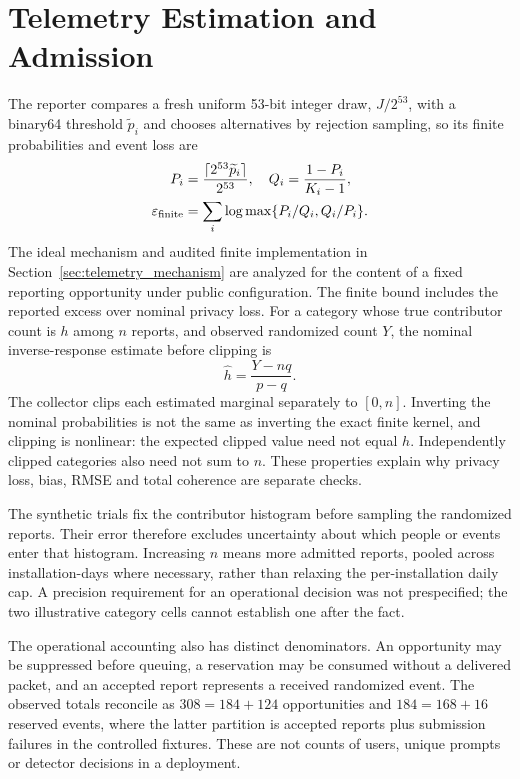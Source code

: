 \documentclass[sigconf]{acmart}
\theoremstyle{acmdefinition}\newtheorem{property}{Property}
\begin{document}
\section{Telemetry Estimation and Admission}
\label{app:reporting}
The reporter compares a fresh uniform 53-bit integer draw, $J/2^{53}$, with a binary64 threshold $\widetilde p_i$ and chooses alternatives by rejection sampling, so its finite probabilities and event loss are
\begin{equation}
\label{eq:finite}
\begin{aligned}
P_i&=\frac{\lceil2^{53}\widetilde p_i\rceil}{2^{53}},\quad Q_i=\frac{1-P_i}{K_i-1},\\
\varepsilon_{\rm finite}&=\sum_i\log\max\{P_i/Q_i,Q_i/P_i\}.
\end{aligned}
\end{equation}
The ideal mechanism and audited finite implementation in Section~\ref{sec:telemetry_mechanism} are analyzed for the content of a fixed reporting opportunity under public configuration. The finite bound includes the reported excess over nominal privacy loss. For a category whose true contributor count is $h$ among $n$ reports, and observed randomized count $Y$, the nominal inverse-response estimate before clipping is
\begin{equation}
\widehat h=\frac{Y-nq}{p-q}.
\end{equation}
The collector clips each estimated marginal separately to $[0,n]$. Inverting the nominal probabilities is not the same as inverting the exact finite kernel, and clipping is nonlinear: the expected clipped value need not equal $h$. Independently clipped categories also need not sum to $n$. These properties explain why privacy loss, bias, RMSE and total coherence are separate checks.

The synthetic trials fix the contributor histogram before sampling the randomized reports. Their error therefore excludes uncertainty about which people or events enter that histogram. Increasing $n$ means more admitted reports, pooled across installation-days where necessary, rather than relaxing the per-installation daily cap. A precision requirement for an operational decision was not prespecified; the two illustrative category cells cannot establish one after the fact.

The operational accounting also has distinct denominators. An opportunity may be suppressed before queuing, a reservation may be consumed without a delivered packet, and an accepted report represents a received randomized event. The observed totals reconcile as $308=184+124$ opportunities and $184=168+16$ reserved events, where the latter partition is accepted reports plus submission failures in the controlled fixtures. These are not counts of users, unique prompts or detector decisions in a deployment.
\end{document}
